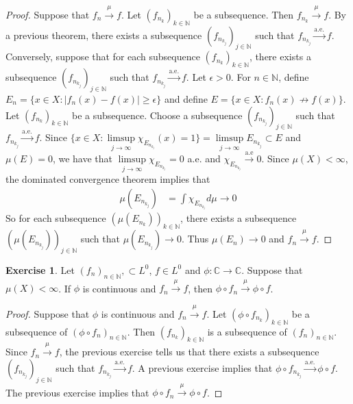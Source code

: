 \documentclass[12pt]{amsart}
\theoremstyle{definition}
\newtheorem{ex}[definition]{Exercise}
\newcommand{\ep}{\epsilon}
\newcommand{\C}{\mathbb{C}}
\newcommand{\N}{\mathbb{N}}
\newcommand{\convt}[1]{\xrightarrow{\text{#1}}}
\newcommand{\conv}[1]{\xrightarrow{#1}}
\begin{document}
	\begin{proof}
		Suppose that $f_n \conv{\mu} f$. Let $(f_{n_k})_{k \in \N}$ be a subsequence. Then $f_{n_k} \conv{\mu} f$. By a previous theorem, there exists a subsequence $(f_{n_{k_j}})_{j \in \N}$ such that $f_{n_{k_j}} \convt{a.e.} f$. Conversely, suppose that for each subsequence $(f_{n_k})_{k \in \N}$, there exists a subsequence $(f_{n_{k_j}})_{j \in \N}$ such that $f_{n_{k_j}} \convt{a.e.} f$. Let $\ep >0$. For $n \in \N$, define $E_{n} = \{x \in X: |f_n(x) - f(x) | \geq \ep\}$ and define $E = \{x \in X: f_n(x) \not \rightarrow f(x)\}$. Let $(f_{n_k})_{k \in \N}$ be a subsequence. Choose a subsequence $(f_{n_{k_j}})_{j \in \N}$ such that $f_{n_{k_j}} \convt{a.e.} f$. Since $\bigg \{x \in X: \limsup\limits_{j \rightarrow \infty} \chi_{E_{n_{k_j}}}(x) = 1\bigg \} = \limsup\limits_{j \rightarrow \infty} E_{n_{k_j}} \subset E$ and $\mu(E) = 0$, we have that $\limsup\limits_{j \rightarrow \infty} \chi_{E_{n_{k_j}}} = 0$ a.e. and $\chi_{E_{n_{k_j}}} \convt{a.e} 0$. Since $\mu(X) < \infty$, the dominated convergence theorem implies that 
		\begin{align*}
			\mu(E_{n_{k_j}}) 
			&= \int \chi_{E_{n_{k_j}}} d \mu  \rightarrow 0
		\end{align*} 
		So for each subsequence $(\mu(E_{n_k}))_{k \in \N}$, there exists a subsequence $(\mu(E_{n_{k_j}}))_{j \in \N}$ such that $\mu(E_{n_{k_j}}) \rightarrow 0$. Thus $\mu(E_n) \rightarrow 0$ and $f_n \conv{\mu} f$.
	\end{proof}
	
	\begin{ex}
		Let $(f_n)_{n \in \N}, \subset L^0$, $f \in L^0$ and $\phi: \C \rightarrow \C$. Suppose that $\mu(X) < \infty$. If $\phi$ is continuous and $f_n \conv{\mu} f$, then $\phi \circ f_n \conv{\mu} \phi \circ f$.
	\end{ex}
	
	\begin{proof}
		Suppose that $\phi$ is continuous and $f_n \conv{\mu} f$. Let $(\phi \circ f_{n_k})_{k \in \N}$ be a subsequence of $(\phi \circ f_{n})_{n \in \N}$. Then $(f_{n_k})_{k \in \N}$ is a subsequence of $(f_{n})_{n \in \N}$. Since $f_n \conv{\mu} f$, the previous exercise tells us that there exists a subsequence $(f_{n_{k_j}})_{j \in \N}$ such that $f_{n_{k_j}} \convt{a.e.} f$. A previous exercise implies that $\phi \circ f_{n_{k_j}}\convt{a.e.} \phi \circ f$. The previous exercise implies that $\phi \circ f_{n}\conv{\mu} \phi \circ f$.
	\end{proof}
	
\end{document}
